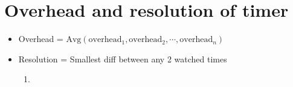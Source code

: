 \section*{Overhead and resolution of timer}
\begin{itemize}
\item Overhead = $\text{Avg}(\text{overhead}_1,\text{overhead}_2,\cdots,\text{overhead}_n)$
\item Resolution = Smallest diff between any 2 watched times
  \begin{enumerate}
  \item
  \end{enumerate}
\end{itemize}

